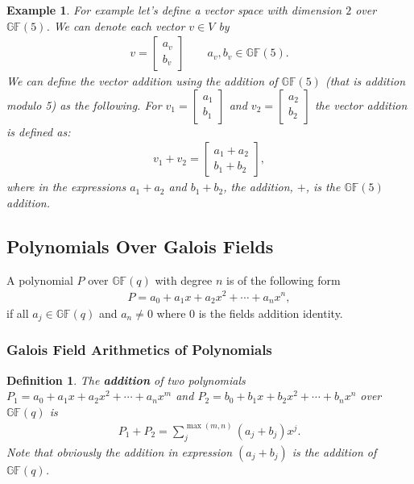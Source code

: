 \documentclass[12pt]{article}
\newtheorem{example}{Example}
\newtheorem{definition}{Definition}
\newcommand{\gf}[1]{\mathds{GF}\left(#1\right)} %
\begin{document}
\begin{example}
	For example let's define a vector space with dimension $2$ over $\gf{5}$. We can denote each vector $v \in  V$ by
	\begin{align*}
		v = \left[\begin{array}{c}
		a_v \\ b_v
		\end{array}\right] \qquad a_v, b_v \in \gf{5}.
	\end{align*}
	We can define the vector addition using the addition of $\gf{5}$ (that is addition modulo 5) as the following.
	For $v_1 = \left[\begin{array}{c} 
	a_1 \\ b_1
	\end{array}\right] $ and $v_2 = \left[\begin{array}{c}
	a_2 \\ b_2
	\end{array}\right] $ the vector addition is defined as:
	\begin{align*}
	v_1 + v_2 = \left[\begin{array}{c}
	a_1 + a_2 \\ b_1 + b_2
	\end{array}\right] 	,
	\end{align*} where in the expressions $a_1 + a_2$ and $b_1 + b_2$, the addition, $+$, is the $\gf{5}$ addition. 
\end{example}


\subsection{Polynomials Over Galois Fields}


A polynomial ${P}$  over $\gf{q}$ with degree $n$ is of the following form
\begin{align*}
	P = a_0 + a_1 x + a_2 x^2 + \cdots + a_n x^n,
\end{align*}
if all $a_j \in \gf{q}$ and $a_n \ne 0$ where $0$ is the fields addition identity. 


\subsubsection{Galois Field Arithmetics of Polynomials}

\begin{definition}
	The \textbf{addition} of two polynomials $P_1 = a_0 + a_1 x + a_2 x^2 + \cdots + a_n x^m$ and $P_2 = b_0 + b_1 x + b_2 x^2 + \cdots + b_n x^n$ over $\gf{q}$ is 
	\begin{align*}
		P_1 + P_2 = \sum_{j}^{\max(m,n)} (a_j + b_j) x^j.
	\end{align*}
	Note that obviously the addition in expression $(a_j + b_j)$ is the addition of $\gf{q}$.
\end{definition}
\end{document}
